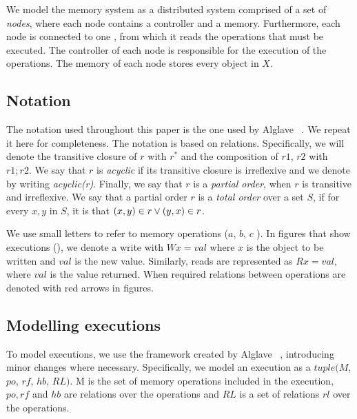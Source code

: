 We model the memory system as a distributed system comprised of a set of \emph{nodes}, where each node contains a controller and a memory.
Furthermore, each node is connected to one \rob, from which it reads the operations that must be executed. The controller of each node is responsible for the execution of the operations. The memory of each node stores every object in $X$.

















\subsection{Notation}
The notation used throughout this paper is the one used by Alglave \etal~\cite{Alglave:2014}. We repeat it here 
for completeness.
The notation is based on relations.
Specifically, we will denote the transitive closure of $r$ with $r^\ast$ and the composition of $r1$, $r2$ with $r1;r2$. 
We say that $r$ is \emph{acyclic} if its transitive closure is irreflexive and we denote by writing \emph{acyclic(r)}.
Finally, we say that $r$ is a \emph{partial order}, when $r$ is transitive and irreflexive. We say that a partial order $r$ is a \emph{total order} over a set $S$, if for every $x,y$ in $S$, it is that $(x, y) \in r \vee (y,x) \in r$.

We use small letters to refer to memory operations (\eg $a$, $b$, $c$ \etc).
In figures that show executions (\eg {}), we denote a write with $Wx = val$ where $x$ is the object to be written and $val$ is the new value.
Similarly, reads are represented as $Rx = val$, where $val$ is the  value returned.
When required relations between operations are denoted with red arrows in figures.


\subsection{Modelling executions}
To model executions, we use the framework created by Alglave \etal~\cite{Alglave:2014}, introducing minor changes where necessary. 
Specifically, we model an execution as a $tuple(M$, $po$, $rf$, $hb$, $RL)$.
M is the set of memory operations included in the execution, $po, rf$ and $hb$ are relations over the operations and $RL$ is a set of relations $rl$ over the operations.



